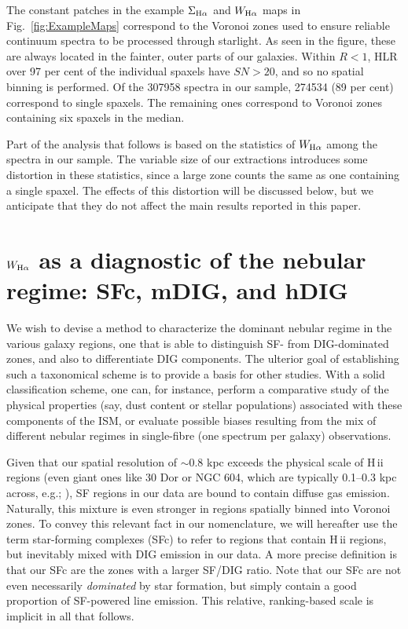 \documentclass[a4paper, fleqn, usenatbib, useAMS]{mnras}
\newcommand{\Ha}{\ifmmode {\rm H}\alpha \else H$\alpha$\fi\xspace}
\newcommand{\hii}{H\,{\sc ii}\xspace}
\begin{document}
The constant patches in the example $\Sigma_{\Ha}$ and $W_{\Ha}$ maps in Fig.\ \ref{fig:ExampleMaps} correspond to the Voronoi zones used to ensure reliable continuum spectra to be processed through {\sc starlight}. As seen in the figure, these are always located in the fainter, outer parts of our galaxies. Within $R < 1$, HLR over 97 per cent of the individual spaxels have $SN > 20$, and so no spatial binning is performed. Of the 307958 spectra in our sample, 274534 (89 per cent) correspond to single spaxels. The remaining ones correspond to Voronoi zones containing six spaxels in the median.

Part of the analysis that follows is based on the statistics of $W_{\Ha}$ among the spectra in our sample. The variable size of our extractions introduces some distortion in these statistics, since a large zone counts the same as one containing a single spaxel. The effects of this distortion will be discussed below, but we anticipate that they do not affect the main results reported in this paper.

\section{$W_{\Ha}$ as a diagnostic of the nebular regime: SF\lowercase{c}, \lowercase{m}DIG, and \lowercase{h}DIG}
\label{sec:DIGxHII}

We wish to devise a method to characterize the dominant nebular regime in the various galaxy regions, one that is able to distinguish SF- from DIG-dominated zones, and also to differentiate  DIG components. The ulterior goal of establishing such a taxonomical scheme is to provide a basis for other studies. With a solid classification scheme, one can, for instance, perform a comparative study of the physical properties (say, dust content or stellar populations) associated with these components of the ISM, or evaluate possible biases resulting from the mix of different nebular regimes in single-fibre (one spectrum per galaxy) observations.

Given that our spatial resolution of  $\sim 0.8$ kpc exceeds the physical scale of \hii regions (even giant ones like 30 Dor or NGC 604, which are typically 0.1--0.3 kpc across, e.g.; \citealt{Rosa.y.Enrique.2000}), SF regions in our data are bound to contain diffuse gas emission. Naturally, this mixture is even stronger in regions spatially binned into Voronoi zones. To convey this relevant fact in our nomenclature, we will hereafter use the term star-forming complexes (SFc) to refer to regions that contain \hii regions, but inevitably mixed with DIG emission in our data. A more precise definition is that our SFc are the zones with a larger SF/DIG ratio. Note that our SFc are not even necessarily \textit{dominated} by star formation, but simply contain a good proportion of SF-powered line emission.  This relative, ranking-based scale is implicit in all that follows.
\end{document}

